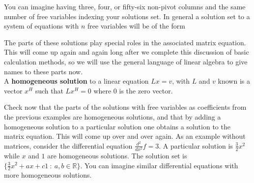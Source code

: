 \begin{center}
{}
\end{center}

You can imagine having three, four, or fifty-six non-pivot columns and the same number of free variables indexing your solutions set. 
In general a solution set to a system of equations with $n$ free variables will be of the form 
\begin{center}
\end{center}

The parts of these solutions play special roles in the associated matrix equation. This will come up again and again long after we complete this discussion of basic calculation methods, so we will use the general language of linear algebra to give names to these parts now. \\

 A {\bfseries homogeneous solution} to a linear equation $Lx=v$, with $L$ and $v$ known is a vector $x^H $ such  that $Lx^H =0$ where $0$ is the zero vector. \\




\begin{center}
\end{center}



Check now that the parts of the solutions with free variables as coefficients from the previous examples are homogeneous solutions, and that by adding a homogeneous solution to a particular solution one obtains a solution to the matrix equation. This will come up over and over again. As an example without matrices, consider the differential equation $\frac{d^2}{dx^2} f=3$. A particular solution is $\frac32x^2$ while $x$ and $1$ are homogeneous solutions. The solution set is $\{ \frac32 x^2+ax +c1 ~:~a,b\in\mathbb{R} \}$. You can imagine similar differential equations with more homogeneous solutions. \\


